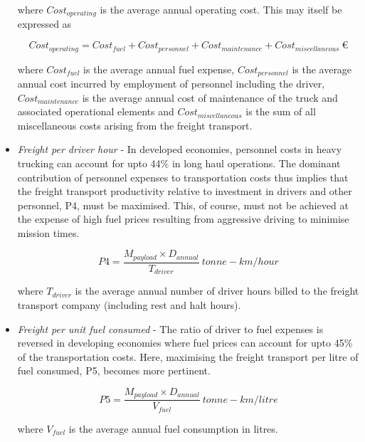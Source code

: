 \documentclass[ExampleMasters.tex]{subfiles}
\begin{document}
\begin{itemize}
			where $Cost_{operating}$ is the average annual operating cost. This may itself be expressed as 

			\begin{equation}
				Cost_{operating} = Cost_{fuel} + Cost_{personnel} + Cost_{maintenance} + Cost_{miscellaneous} \ \euro
			\end{equation}

			where $Cost_{fuel}$ is the average annual fuel expense, $Cost_{personnel}$ is the average annual cost incurred by employment of personnel including the driver, $Cost_{maintenance}$  is the average annual cost of maintenance of the truck and associated operational elements and $Cost_{miscellaneous}$ is the sum of all miscellaneous costs arising from the freight transport.\\

			\item \textit{Freight per driver hour} - In developed economies, personnel costs in heavy trucking can account for upto 44\% in long haul operations. The dominant contribution of personnel expenses to transportation costs thus implies that the freight transport productivity relative to investment in drivers and other personnel, P4, must be maximised. This, of course, must not be achieved at the expense of high fuel prices resulting from aggressive driving to minimise mission times. 

			\begin{equation}
				P4 = \frac{M_{payload} \times D_{annual}}{T_{driver}} \ tonne-km/hour
			\end{equation}

			where $T_{driver}$ is the average annual number of driver hours billed to the freight transport company (including rest and halt hours).\\

			\item \textit{Freight per unit fuel consumed} - The ratio of driver to fuel expenses is reversed in developing economies where fuel prices can account for upto 45\% of the transportation costs. Here, maximising the freight transport per litre of fuel consumed, P5, becomes more pertinent.
			
			\begin{equation}
				P5 = \frac{M_{payload} \times D_{annual}}{V_{fuel}} \ tonne-km/litre
			\end{equation}

			where $V_{fuel}$ is the average annual fuel consumption in litres.\\


\end{itemize}
\end{document}
